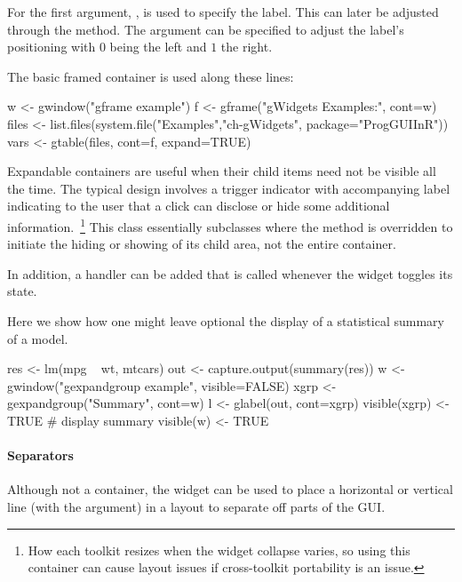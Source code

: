 For  the first argument, , is
used to specify the label. This can later be adjusted through the
 method. The argument
 can be specified to adjust the label's
positioning with $0$ being the left and $1$ the right.



The basic framed container is used along these lines:
\begin{Schunk}
\begin{Sinput}
 w <- gwindow("gframe example")
 f <- gframe("gWidgets Examples:", cont=w)
 files <- list.files(system.file("Examples","ch-gWidgets", 
                                 package="ProgGUIInR"))
 vars <- gtable(files, cont=f, expand=TRUE)
\end{Sinput}
\end{Schunk}


Expandable containers are useful when their child items need not be
visible all the time. The typical design involves a trigger indicator
with accompanying label indicating to the user that a click can
disclose or hide some additional information.~\footnote{How each
  toolkit resizes when the widget collapse varies, so using this
  container can cause layout issues if cross-toolkit portability is an
  issue.}  This class essentially subclasses  where the
 method is overridden to initiate
the hiding or showing of its child area, not the entire container.

In addition, a handler can be added that is called whenever the widget
toggles its state.

Here we show how one might leave optional the display of a statistical
summary of a model.
\begin{Schunk}
\begin{Sinput}
 res <- lm(mpg ~ wt, mtcars)
 out <- capture.output(summary(res))
 w <- gwindow("gexpandgroup example", visible=FALSE)
 xgrp <- gexpandgroup("Summary", cont=w)
 l <- glabel(out, cont=xgrp)
 visible(xgrp) <- TRUE                   # display summary
 visible(w) <- TRUE
\end{Sinput}
\end{Schunk}


\paragraph{Separators}
Although not a container, the  widget can be
used to place a horizontal or vertical line (with the
 argument) in a layout to separate off parts of
the GUI. 




